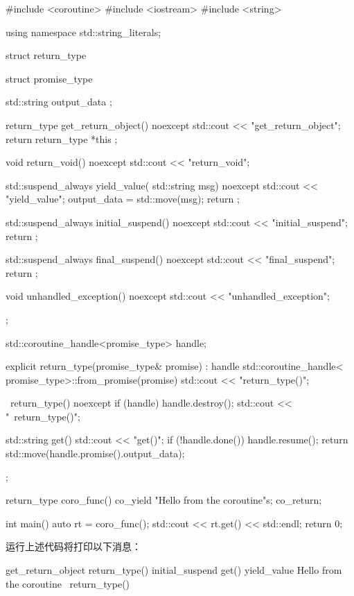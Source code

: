 \begin{cpp}
#include <coroutine>
#include <iostream>
#include <string>

using namespace std::string_literals;

struct return_type {
    struct promise_type {
        std::string output_data { };

        return_type get_return_object() noexcept {
            std::cout << "get_return_object\n";
            return return_type{ *this };
        }

        void return_void() noexcept {
            std::cout << "return_void\n";
        }

        std::suspend_always yield_value(
        std::string msg) noexcept {
            std::cout << "yield_value\n";
            output_data = std::move(msg);
            return {};
        }

        std::suspend_always initial_suspend() noexcept {
            std::cout << "initial_suspend\n";
            return {};
        }

        std::suspend_always final_suspend() noexcept {
            std::cout << "final_suspend\n";
            return {};
        }

        void unhandled_exception() noexcept {
            std::cout << "unhandled_exception\n";
        }
    };

    std::coroutine_handle<promise_type> handle{};

    explicit return_type(promise_type& promise)
        : handle{ std::coroutine_handle<
                  promise_type>::from_promise(promise)}{
        std::cout << "return_type()\n";
    }

    ~return_type() noexcept {
        if (handle) {
            handle.destroy();
        }
        std::cout << "~return_type()\n";
    }

    std::string get() {
        std::cout << "get()\n";
        if (!handle.done()) {
            handle.resume();
        }
        return std::move(handle.promise().output_data);
    }
};

return_type coro_func() {
    co_yield "Hello from the coroutine\n"s;
    co_return;
}

int main() {
    auto rt = coro_func();
    std::cout << rt.get() << std::endl;
    return 0;
}
\end{cpp}

运行上述代码将打印以下消息：

\begin{shell}
get_return_object
return_type()
initial_suspend
get()
yield_value
Hello from the coroutine
~return_type()
\end{shell}


